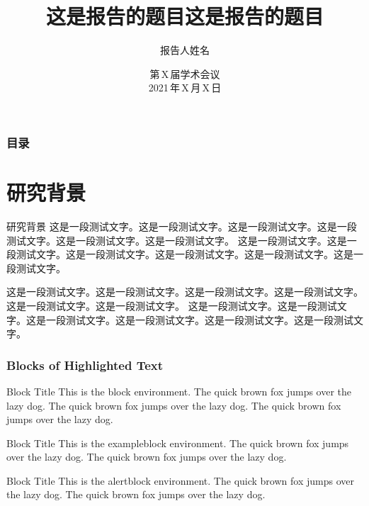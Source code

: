\documentclass[noamsthm,notheorem,11pt,compress]{beamer}
\title[报告题目]{这是报告的题目这是报告的题目}
\author[姓名]{报告人姓名}
\institute[XX大学]{\vskip -10pt
\small \textcolor{blue}{XX\,大学数学系}
\vskip 10pt
}
\date[2021\,年\,X\,月\,X\,日]{第\,X\,届学术会议 \\[5pt] 2021\,年\,X\,月\,X\,日 }
\numberwithin{figure}{section}
\numberwithin{table}{section}
\numberwithin{equation}{section}
\theoremstyle{plain} %
\begin{document}
\setlength{\baselineskip}{15pt}


{
\begin{frame}
\titlepage %
\end{frame}}


\begin{frame}
\frametitle{目录}
\tableofcontents
\end{frame}



\section{研究背景}

\begin{frame}{研究背景}
这是一段测试文字。这是一段测试文字。这是一段测试文字。这是一段测试文字。这是一段测试文字。这是一段测试文字。
这是一段测试文字。这是一段测试文字。这是一段测试文字。这是一段测试文字。这是一段测试文字。这是一段测试文字。

\vspace{1ex}
这是一段测试文字。这是一段测试文字。这是一段测试文字。这是一段测试文字。这是一段测试文字。这是一段测试文字。
这是一段测试文字。这是一段测试文字。这是一段测试文字。这是一段测试文字。这是一段测试文字。这是一段测试文字。

\end{frame}


\begin{frame}
\frametitle{Blocks of Highlighted Text}
\begin{block}{Block Title}
This is the block environment. The quick brown fox jumps over the lazy dog. The quick brown fox jumps over the lazy dog. The quick brown fox jumps over the lazy dog.
\end{block}

\begin{exampleblock}{Block Title}
This is the exampleblock environment. The quick brown fox jumps over the lazy dog. The quick brown fox jumps over the lazy dog.
\end{exampleblock}

\begin{alertblock}{Block Title}
This is the alertblock environment. The quick brown fox jumps over the lazy dog. The quick brown fox jumps over the lazy dog.
\end{alertblock}
\end{frame}
\end{document}
